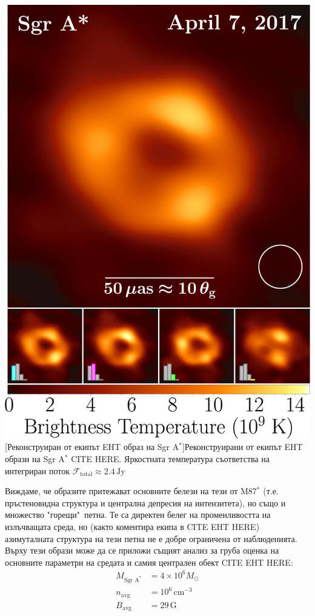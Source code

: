 \begin{minipage}{15em}
	\centering
	\includegraphics[scale = 0.5]{SgrA_Avg_Images.jpg}
	[Реконструиран от екипът EHT образ на Sgr A$^*$]{\small Реконструирани от екипът EHT образи на Sgr A$^*$ CITE HERE. Яркостната температура съответства на интегриран поток $\mathcal{F}_{\text{total}}\approx2.4\,\text{Jy}$}
	\label{SgrA_I_Image}
\end{minipage}
\begin{minipage}{16em}
Виждаме, че образите притежават основните белези на тези от M87$^*$ (т.е. пръстеновидна структура и централна депресия на интензитета), но също и множество "горещи"$\,$ петна. Те са директен белег на променливостта на излъчващата среда, но (както коментира екипа в CITE EHT HERE) азимуталната структура на тези петна не е добре ограничена от наблюденията. Върху тези образи може да се приложи същият анализ за груба оценка на основните параметри на средата и самия централен обект CITE EHT HERE:
\begin{equation}
	\begin{aligned}
	M_{\text{Sgr A}^*} &= 4\times 10^6 M_\odot\\
	n_{\text{avg}} &= 10^6\, \text{cm}^{-3}\\
	B_{\text{avg}} &= 29\, \text{G}
	\end{aligned}
\end{equation}
\end{minipage}\\


